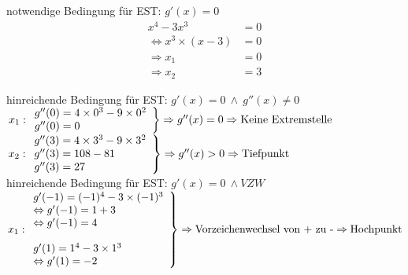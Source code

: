 \documentclass[arbeitsmappe.tex]{subfiles}
\begin{document}
    notwendige Bedingung für EST: $g'(x) = 0$ \\
    \begin{align*}
        x^4 - 3x^3 &= 0 \\
        \Leftrightarrow x^3 \times (x-3) &= 0 \\
        \Rightarrow x_1 &= 0 \\
        \Rightarrow x_2 &= 3
    \end{align*}

    hinreichende Bedingung für EST: $g'(x) = 0\ \land\ g''(x)\ne 0$ \\

    $\left.
    x_1:
    \begin{array}{ll}
        g''(0) = 4 \times 0^3 - 9 \times 0^2 \\
        g''(0) = 0                           \\
    \end{array}
    \right\} \Rightarrow \text{$g''(x) = 0$} \Rightarrow \text{Keine Extremstelle} \\
    $
    \\
    $\left.
    x_2:
    \begin{array}{ll}
        g''(3) = 4 \times 3^3 - 9 \times 3^2 \\
        g''(3) = 108-81                      \\
        g''(3) = 27                          \\
    \end{array}
    \right\} \Rightarrow \text{$g''(x) > 0$} \Rightarrow \text{Tiefpunkt} \\
    $
    \\
    hinreichende Bedingung für EST: $g'(x) = 0\ \land VZW$
    \\[1cm]
    $\left.
    x_1:
    \begin{array}{ll}
        g'(-1) = (-1)^4 - 3\times (-1)^3 \\
        \Leftrightarrow g'(-1) = 1+3     \\
        \Leftrightarrow g'(-1) = 4       \\
        \\
        g'(1) = 1^4 - 3\times 1^3 \\
        \Leftrightarrow g'(1) = -2 \\
    \end{array}
    \right\} \Rightarrow \text{Vorzeichenwechsel von + zu -} \Rightarrow \text{Hochpunkt} \\
    $
    \\[1cm]
\end{document}
